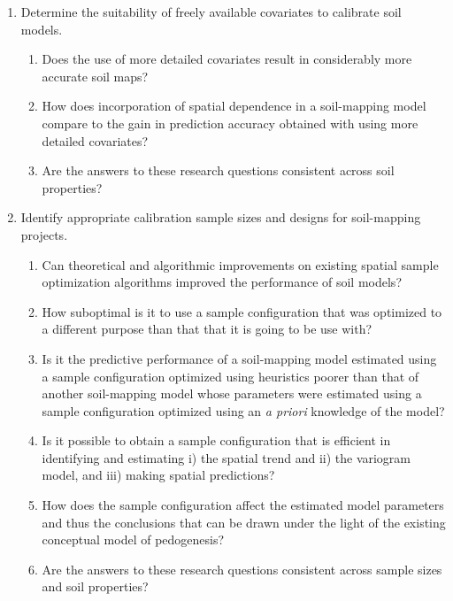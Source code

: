 \begin{enumerate}
\item Determine the suitability of freely available covariates to calibrate soil models.

	\begin{enumerate}[label=(\alph*)]
	\item Does the use of more detailed covariates result in considerably more accurate soil
	maps?

	\item How does incorporation of spatial dependence in a soil-mapping model compare to the
	gain in prediction accuracy obtained with using more detailed covariates?

	\item Are the answers to these research questions consistent across soil properties?
	\end{enumerate}

\item Identify appropriate calibration sample sizes and designs for soil-mapping projects.

	\begin{enumerate}[label=(\alph*)]
	\item Can theoretical and algorithmic improvements on existing spatial sample optimization
	algorithms improved the performance of soil models?
	
	\item How suboptimal is it to use a sample configuration that was optimized to a different
	purpose than that that it is going to be use with?

	\item Is it the predictive performance of a soil-mapping model estimated using a sample
	configuration optimized using heuristics poorer than that of another soil-mapping model
	whose parameters were estimated using a sample configuration optimized using an
	\textit{a priori} knowledge of the model?
	
	\item Is it possible to obtain a sample configuration that is efficient in identifying and
	estimating i) the spatial trend and ii) the variogram model, and iii) making spatial
	predictions?
	
	\item How does the sample configuration affect the estimated model parameters and thus the
	conclusions that can be drawn under the light of the existing conceptual model of
	pedogenesis?
	
	\item Are the answers to these research questions consistent across sample sizes and soil
	properties?
	\end{enumerate}
\end{enumerate}

